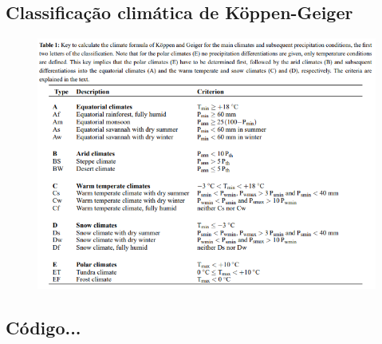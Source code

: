 \documentclass[brazil,hardcopy,openany,a5paper]{ufscthesis}
\begin{document}
\begin{appendices}
	\chapter{Classificação climática de Köppen-Geiger}
	\begin{figure}[!h]
		\centering
		\includegraphics[width=1\linewidth]{img/tablekoppengeiger1.png}
		\label{fig:tablekoppengeiger1}
	\end{figure}
\end{appendices}

\begin{appendices}
	\chapter{Código...}
	\lstset{language=c++}
	\lstset{basicstyle=\tiny}	
	
\end{appendices}

%
%

	
\end{document}
